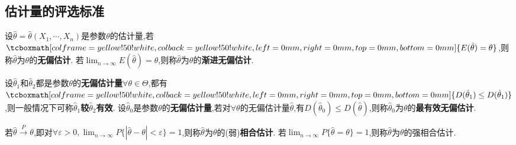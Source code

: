 \documentclass[UTF8]{ctexart}
\newcommand\stress{\tcboxmath[colframe=yellow!50!white,colback=yellow!50!white,left=0mm,right=0mm,top=0mm,bottom=0mm]}
\begin{document}
\newpage
\subsection{估计量的评选标准}
\begin{tcolorbox}[colframe=blue,title={\subsubsection{无偏性}}]
设$\hat\theta=\hat\theta(X_1,\cdots,X_n)$是参数$\theta$的估计量,若$\stress{E(\hat\theta)=\theta}$,则称$\hat\theta$为$\theta$的\textbf{无偏估计}.
\tcbline
若$\lim_{n\rightarrow\infty}E(\hat\theta)=\theta$,则称$\hat\theta$为$\theta$的\textbf{渐进无偏估计}.
\end{tcolorbox}

\begin{tcolorbox}[colframe=blue,title={\subsubsection{有效性}}]
设$\hat\theta_1$和$\hat\theta_2$都是参数$\theta$的\textbf{无偏估计量}$\forall\theta\in\Theta$,都有$\stress{D(\hat\theta_1)\leq D(\hat\theta_1)}$,则一般情况下可称$\hat\theta_1$\textbf{较}$\hat\theta_2$\textbf{有效}.
\tcbline
设$\hat\theta_0$是参数$\theta$的\textbf{无偏估计量},若对$\forall\theta$的无偏估计量$\hat\theta$,有$D(\hat\theta_0)\leq D(\hat\theta)$,则称$\hat\theta_0$为$\theta$的\textbf{最有效无偏估计}.
\end{tcolorbox}

\begin{tcolorbox}[colframe=blue,title={\subsubsection{相合性}}]
若$\hat\theta\overset{P}{\rightarrow}\theta$,即对$\forall\varepsilon>0,\lim_{n\rightarrow\infty}P\{|\hat\theta-\theta|<\varepsilon\}=1$,则称$\hat\theta$为$\theta$的(弱){\bf 相合估计}.
\tcbline
若$\lim_{n\rightarrow\infty}P\{\hat\theta=\theta\}=1$,则称$\hat\theta$为$\theta$的强相合估计.
\end{tcolorbox}
\end{document}

